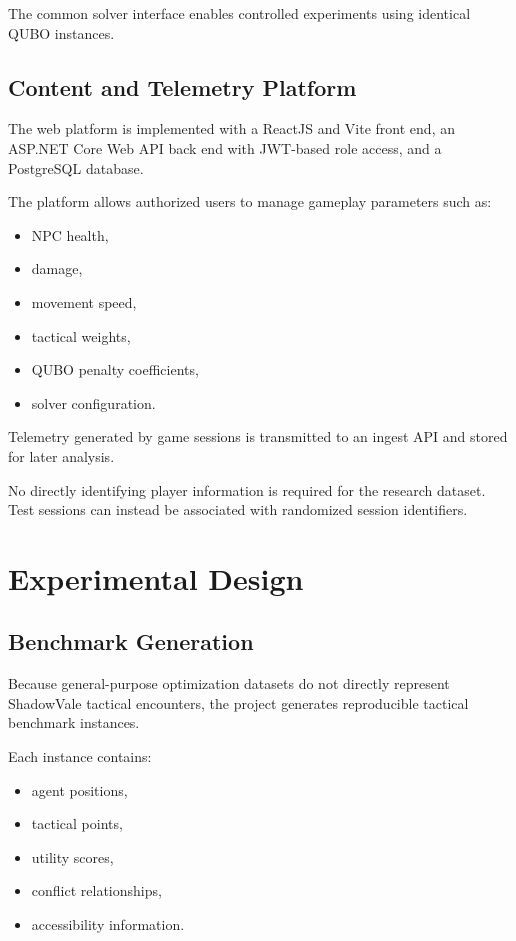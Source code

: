 \documentclass[12pt, a4paper]{article}
\begin{document}
The common solver interface enables controlled experiments using identical QUBO instances.

\subsection*{Content and Telemetry Platform}

The web platform is implemented with a ReactJS and Vite front end, an ASP.NET Core Web API back end with JWT-based role access, and a PostgreSQL database.

The platform allows authorized users to manage gameplay parameters such as:

\begin{itemize}
\item NPC health,
\item damage,
\item movement speed,
\item tactical weights,
\item QUBO penalty coefficients,
\item solver configuration.
\end{itemize}

Telemetry generated by game sessions is transmitted to an ingest API and stored for later analysis.

No directly identifying player information is required for the research dataset. Test sessions can instead be associated with randomized session identifiers.

\section*{Experimental Design}

\subsection*{Benchmark Generation}

Because general-purpose optimization datasets do not directly represent ShadowVale tactical encounters, the project generates reproducible tactical benchmark instances.

Each instance contains:

\begin{itemize}
\item agent positions,
\item tactical points,
\item utility scores,
\item conflict relationships,
\item accessibility information.
\end{itemize}
\end{document}

